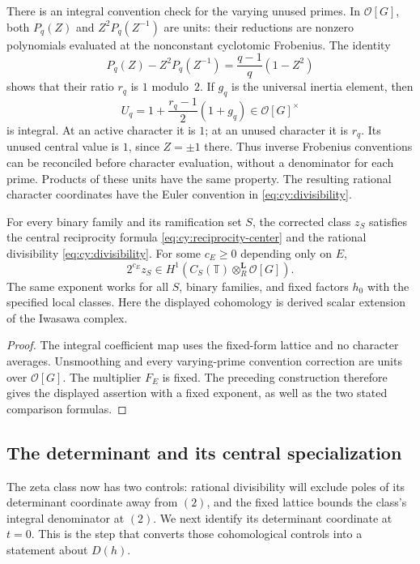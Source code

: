 There is an integral convention check for the varying unused primes.
In $\mathcal O[G]$, both $P_q(Z)$ and $Z^2P_q(Z^{-1})$ are units: their
reductions are nonzero polynomials evaluated at the nonconstant
cyclotomic Frobenius.  The identity
\[
 P_q(Z)-Z^2P_q(Z^{-1})=\frac{q-1}{q}(1-Z^2)
\]
shows that their ratio $r_q$ is $1$ modulo~$2$.  If $g_q$ is the universal
inertia element, then
\begin{equation}\label{eq:cy:reciprocal-correction}
 U_q=1+\frac{r_q-1}{2}(1+g_q)\in\mathcal O[G]^\times
\end{equation}
is integral.  At an active character it is $1$; at an unused character
it is $r_q$.  Its unused central value is $1$, since $Z=\pm1$ there.
Thus inverse Frobenius conventions can be reconciled before character
evaluation, without a denominator for each prime.  Products of these
units have the same property.  The resulting rational character
coordinates have the Euler convention in \eqref{eq:cy:divisibility}.

\begin{lemma}\label{lem:cy:kato-class}
For every binary family and its ramification set $S$, the corrected
class $z_S$ satisfies the central reciprocity formula \eqref{eq:cy:reciprocity-center} and the rational divisibility
\eqref{eq:cy:divisibility}. For some $c_E\ge0$ depending only on $E$,
\[
 2^{c_E}z_S\in
 H^1\!\left(C_S(\mathbb T)\otimes_R^{\mathbf L}\mathcal O[G]\right).
\]
The same exponent works for all $S$, binary families, and fixed factors
$h_0$ with the specified local classes. Here the displayed cohomology
is derived scalar extension of the Iwasawa complex.
\end{lemma}
\begin{proof}
The integral coefficient map uses the fixed-form lattice and no
character averages. Unsmoothing and every varying-prime convention
correction are units over $\mathcal O[G]$. The multiplier $F_E$ is fixed.
The preceding construction therefore gives the displayed assertion
with a fixed exponent, as well as the two stated comparison formulas.
\end{proof}

\subsection{The determinant and its central specialization}

The zeta class now has two controls: rational divisibility will exclude
poles of its determinant coordinate away from $(2)$, and the fixed
lattice bounds the class's integral denominator at $(2)$. We next
identify its determinant coordinate at
$t=0$. This is the step that converts those cohomological controls
into a statement about $D(h)$.

